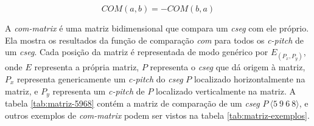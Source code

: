 \documentclass[brazil]{article}
\newcommand{\eng}[1]{\textit{#1}}
\newcommand{\termo}[1]{\textit{#1}}
\begin{document}
\begin{equation}
  \label{eq:inversao-da-comparacao}
  COM(a,b)=-COM(b,a)
\end{equation}

A \termo{com-matrix} é uma matriz bidimensional que compara um
\termo{cseg} com ele próprio. Ela mostra os resultados da função de
comparação \termo{com} para todos os \termo{c-pitch} de um
\termo{cseg}. Cada posição da matriz é representada de modo genérico
por $E_(P_x,P_y)$, onde $E$ representa a própria matriz, $P$
representa o \termo{cseg} que dá origem à matriz, $P_x$ representa
genericamente um \termo{c-pitch} do \termo{cseg} $P$ localizado
horizontalmente na matriz, e $P_y$ representa um \termo{c-pitch} de
$P$ localizado verticalmente na matriz. A tabela \ref{tab:matriz-5968}
contém a matriz de comparação de um \termo{cseg}
$P\:\langle5\:9\:6\:8\rangle$, e outros exemplos de \termo{com-matrix}
podem ser vistos na tabela \ref{tab:matriz-exemplos}.

\begin{table}
  \centering
  \label{tab:matriz-exemplos}
  \caption{Exemplos de \eng{COM-matrix}}
\end{table}
\end{document}
